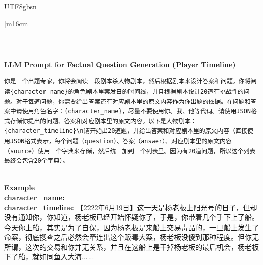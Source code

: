 \documentclass[11pt]{article}
\begin{document}
{\begin{CJK}{UTF8}{gbsn}
\begin{table}[ht!]
\begin{tabular}{|m{16cm}|}
\begin{minipage}[t]{\linewidth}
\begin{verbatim}
\end{verbatim}
\end{minipage} \\
\hline
\hline

\hline
{}  {\textbf{LLM Prompt for Factual Question Generation (Player Timeline)}} \\
\begin{minipage}[t]{\linewidth}
\small\begin{verbatim}
你是一个出题专家，你将会阅读一段剧本杀人物剧本，然后根据剧本来设计答案和问题。你将阅读{character_name}的角色剧本里案发日的时间线，并且根据剧本设计20道有挑战性的问题。对于每道问题，你需要给出答案还有对应剧本里的原文内容作为你出题的依据。在问题和答案中请使用角色名字：{character_name}，尽量不要使用你、我、他等代词。请使用JSON格式存储你提出的问题、答案和对应剧本里的原文内容。以下是人物剧本：{character_timeline}\n请开始出20道题，并给出答案和对应剧本里的原文内容（直接使用JSON格式表示，每个问题（question）、答案（answer）、对应剧本里的原文内容（source）使用一个字典来存储，然后统一加到一个列表里。因为有20道问题，所以这个列表最终会包含20个字典）。

\end{verbatim}
\end{minipage} \\
\hline
{}  \textbf{Example}  \\
 \textbf{  character\_name:} \\
  \textbf{  character\_timeline:} \small【2222年6月19日】这一天是杨老板上阳光号的日子，但却没有通知你，你知道，杨老板已经开始怀疑你了，于是，你带着几个手下上了船。今天你上船，其实是为了自保，因为杨老板是来船上交易毒品的，一旦船上发生了命案，彻底搜查之后必然会牵连出这个贩毒大案，杨老板没傻到那种程度。但你无所谓，这次的交易和你并无关系，并且在这船上是干掉杨老板的最后机会，杨老板下了船，就如同鱼入大海......\\


\end{tabular}
\end{table}
\end{CJK}}
\end{document}
